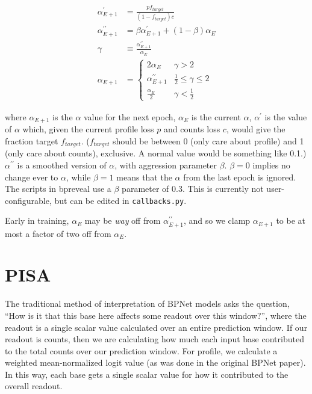 \documentclass{article}
\begin{document}
\begin{align}
    \alpha^\prime_{E+1} &= \frac{p f_{target}}{(1-f_{target}) c} \\
    \alpha^{\prime\prime}_{E+1} &= \beta \alpha^\prime_{E+1} + (1 - \beta) \alpha_{E} \\
    \gamma &\equiv \frac{\alpha^{\prime\prime}_{E+1}}{\alpha_E} \\
    \alpha_{E+1} &= 
    \begin{cases}
        2 \alpha_E & \gamma > 2 \\
        \alpha^{\prime\prime}_{E+1} & \frac{1}{2} \le \gamma \le 2 \\
        \frac{\alpha_E}{2} & \gamma < \frac{1}{2}
    \end{cases}
\end{align}

where $\alpha_{E+1}$ is the $\alpha$ value for the next epoch, $\alpha_E$ is the current $\alpha$,
$\alpha^{\prime}$ is the value of $\alpha$ which, given the current
profile loss $p$ and counts loss $c$, would give the fraction target $f_{target}$.
($f_{target}$ should be between 0 (only care about profile) and 1 (only care about counts),
exclusive. A normal value would be something like 0.1.)
$\alpha^{\prime\prime}$ is a smoothed version of $\alpha$, with 
aggression parameter $\beta$. $\beta=0$ implies no change ever to $\alpha$,
while $\beta = 1$ means that the $\alpha$ from the last epoch is ignored.
The scripts in bpreveal use a $\beta$ parameter of 0.3. This is currently not user-configurable,
but can be edited in \texttt{callbacks.py}.

Early in training, $\alpha_E$ may be \emph{way} off from $\alpha^{\prime\prime}_{E+1}$, and
so we clamp $\alpha_{E+1}$ to be at most a factor of two off from $\alpha_E$.

\section{PISA}\label{sec:pisa}
The traditional method of interpretation of BPNet models asks the question,
``How is it that this base here affects some readout over this window?'',
where the readout is a single scalar value calculated over an entire prediction window.
If our readout is counts, then we are calculating how much each input base contributed to the
total counts over our prediction window. For profile, we calculate a weighted mean-normalized
logit value (as was done in the original BPNet paper). In this way, each base gets a single scalar
value for how it contributed to the overall readout.
\end{document}
